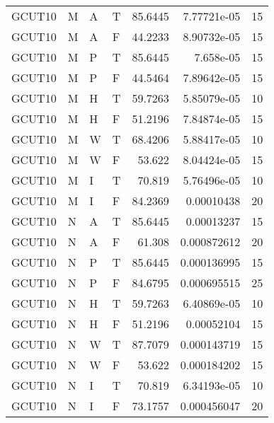 \begin{tabular}{llllrrr}
    GCUT10   & M     & A     & T          & 85.6445    & 7.77721e-05 & 15       \\
    GCUT10   & M     & A     & F          & 44.2233    & 8.90732e-05 & 15       \\
    GCUT10   & M     & P     & T          & 85.6445    & 7.658e-05   & 15       \\
    GCUT10   & M     & P     & F          & 44.5464    & 7.89642e-05 & 15       \\
    GCUT10   & M     & H     & T          & 59.7263    & 5.85079e-05 & 10       \\
    GCUT10   & M     & H     & F          & 51.2196    & 7.84874e-05 & 15       \\
    GCUT10   & M     & W     & T          & 68.4206    & 5.88417e-05 & 10       \\
    GCUT10   & M     & W     & F          & 53.622     & 8.04424e-05 & 15       \\
    GCUT10   & M     & I     & T          & 70.819     & 5.76496e-05 & 10       \\
    GCUT10   & M     & I     & F          & 84.2369    & 0.00010438  & 20       \\
    GCUT10   & N     & A     & T          & 85.6445    & 0.00013237  & 15       \\
    GCUT10   & N     & A     & F          & 61.308     & 0.000872612 & 20       \\
    GCUT10   & N     & P     & T          & 85.6445    & 0.000136995 & 15       \\
    GCUT10   & N     & P     & F          & 84.6795    & 0.000695515 & 25       \\
    GCUT10   & N     & H     & T          & 59.7263    & 6.40869e-05 & 10       \\
    GCUT10   & N     & H     & F          & 51.2196    & 0.00052104  & 15       \\
    GCUT10   & N     & W     & T          & 87.7079    & 0.000143719 & 15       \\
    GCUT10   & N     & W     & F          & 53.622     & 0.000184202 & 15       \\
    GCUT10   & N     & I     & T          & 70.819     & 6.34193e-05 & 10       \\
    GCUT10   & N     & I     & F          & 73.1757    & 0.000456047 & 20       \\
    \hline
\end{tabular}